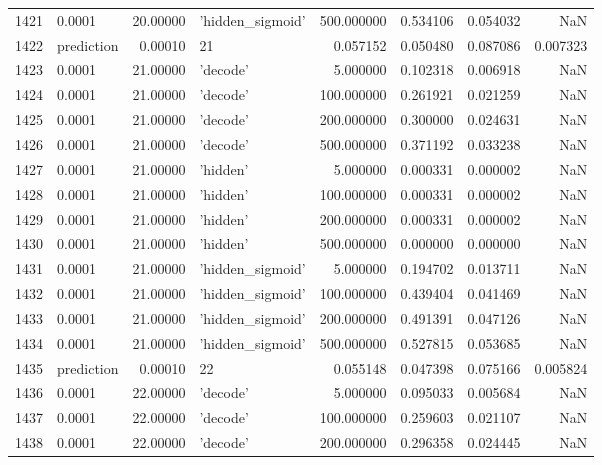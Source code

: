 \documentclass[10pt,a4paper]{article}
\begin{document}
\begin{tabular}{llrlrrrr}
1421 &      0.0001 &  20.00000 &   'hidden\_sigmoid' &  500.000000 &  0.534106 &  0.054032 &       NaN \\
1422 &  prediction &   0.00010 &                 21 &    0.057152 &  0.050480 &  0.087086 &  0.007323 \\
1423 &      0.0001 &  21.00000 &           'decode' &    5.000000 &  0.102318 &  0.006918 &       NaN \\
1424 &      0.0001 &  21.00000 &           'decode' &  100.000000 &  0.261921 &  0.021259 &       NaN \\
1425 &      0.0001 &  21.00000 &           'decode' &  200.000000 &  0.300000 &  0.024631 &       NaN \\
1426 &      0.0001 &  21.00000 &           'decode' &  500.000000 &  0.371192 &  0.033238 &       NaN \\
1427 &      0.0001 &  21.00000 &           'hidden' &    5.000000 &  0.000331 &  0.000002 &       NaN \\
1428 &      0.0001 &  21.00000 &           'hidden' &  100.000000 &  0.000331 &  0.000002 &       NaN \\
1429 &      0.0001 &  21.00000 &           'hidden' &  200.000000 &  0.000331 &  0.000002 &       NaN \\
1430 &      0.0001 &  21.00000 &           'hidden' &  500.000000 &  0.000000 &  0.000000 &       NaN \\
1431 &      0.0001 &  21.00000 &   'hidden\_sigmoid' &    5.000000 &  0.194702 &  0.013711 &       NaN \\
1432 &      0.0001 &  21.00000 &   'hidden\_sigmoid' &  100.000000 &  0.439404 &  0.041469 &       NaN \\
1433 &      0.0001 &  21.00000 &   'hidden\_sigmoid' &  200.000000 &  0.491391 &  0.047126 &       NaN \\
1434 &      0.0001 &  21.00000 &   'hidden\_sigmoid' &  500.000000 &  0.527815 &  0.053685 &       NaN \\
1435 &  prediction &   0.00010 &                 22 &    0.055148 &  0.047398 &  0.075166 &  0.005824 \\
1436 &      0.0001 &  22.00000 &           'decode' &    5.000000 &  0.095033 &  0.005684 &       NaN \\
1437 &      0.0001 &  22.00000 &           'decode' &  100.000000 &  0.259603 &  0.021107 &       NaN \\
1438 &      0.0001 &  22.00000 &           'decode' &  200.000000 &  0.296358 &  0.024445 &       NaN \\

\end{tabular}
\end{document}
